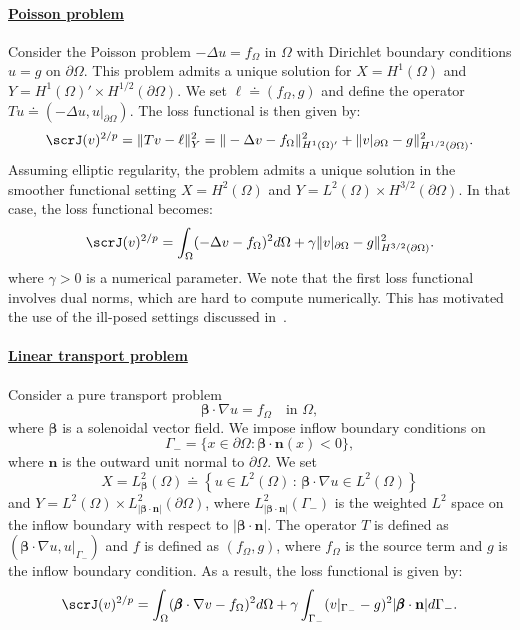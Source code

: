 \documentclass[oneside,reqno,11pt,a4paper]{amsart}
\theoremstyle{definition}
\begin{document}
\paragraph{\underline{\textbf{Poisson problem}}} Consider the Poisson problem
$-\Delta u = f_\Omega$ in $\Omega$ with Dirichlet boundary conditions
$u = g$ on $\partial \Omega$. This problem admits a unique solution for
$X = H^1(\Omega)$ and
$Y = H^{1}(\Omega)' \times H^{1/2}(\partial \Omega)$. We set
$\ell \doteq (f_\Omega, g)$ and define the operator
$T u \doteq (-\Delta u, u|_{\partial \Omega})$. The loss functional is then
given by:
\begin{equation}
  \scrJ(v)^{2/p} = \| T v - \ell \|_Y^{2} = \| -\Delta v - f_\Omega \|_{H^{1}(\Omega)'}^2 + \| v|_{\partial \Omega} - g \|_{H^{1/2}(\partial \Omega)}^2.
\end{equation}
Assuming elliptic regularity, the problem admits a unique solution in the
smoother functional setting
$X = H^2(\Omega)$ and
$Y = L^2(\Omega) \times H^{3/2}(\partial \Omega)$. In that case, the loss
functional becomes:
\begin{equation}
  \scrJ(v)^{2/p} = \int_{\Omega} (-\Delta v - f_\Omega)^2 d\Omega + \gamma \| v|_{\partial \Omega} - g\|_{H^{3/2}(\partial \Omega)}^2.
\end{equation}
where $\gamma > 0$ is a numerical parameter.
We note that the first loss functional involves dual norms, which are hard to
compute numerically. This has motivated the use of the ill-posed settings
discussed in~. 

\paragraph{\underline{\textbf{Linear transport problem}}} 
Consider a pure transport problem
\[
{\pmb{\beta} \cdot \nabla} u = f_\Omega \quad \text{in } \Omega,
\] 
where $\pmb{\beta}$ is a solenoidal vector field. We impose inflow boundary conditions on 
$$\Gamma_- = \{ x \in \partial \Omega : \pmb{\beta} \cdot \mathbf{n}(x) <0 \},$$ 
where $\mathbf{n}$ is the outward unit normal to $\partial \Omega$. We set 
$$X = L^2_{\pmb{\beta}}(\Omega) \doteq \left\{ u \in L^2(\Omega) \, : \, \pmb{\beta}\cdot \nabla u \in L^2(\Omega)\right\}$$ 
and $Y = L^2(\Omega) \times L^2_{|\pmb{\beta}\cdot \pmb{n}|}(\partial \Omega)$, where $L^2_{|\pmb{\beta}\cdot \pmb{n}|}(\Gamma_-)$ is the weighted $L^2$ space on the inflow boundary with respect to $| \pmb{\beta} \cdot \pmb{n} |$. The operator $T$ is defined as $(\pmb{\beta} \cdot \nabla u, u|_{\Gamma_-})$ and $f$ is defined as $(f_\Omega, g)$, where $f_\Omega$ is the source term and $g$ is the inflow boundary condition. As a result, the loss functional is given by:
\begin{equation}
  \scrJ(v)^{2/p} = \int_{\Omega} (\pmb{\beta} \cdot \nabla v - f_\Omega)^2 d\Omega + \gamma \int_{\Gamma_-} (v|_{\Gamma_-} - g)^2 |\pmb{\beta} \cdot \mathbf{n}| d\Gamma_-.
\end{equation}
\end{document}
